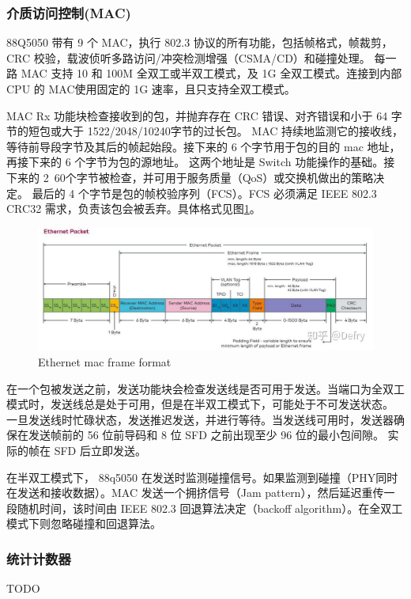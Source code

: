 \subsubsection{介质访问控制(MAC)}
88Q5050 带有 9 个 MAC，执行 802.3 协议的所有功能，包括帧格式，帧裁剪，CRC 校验，载波侦听多路访问/冲突检测增强（CSMA/CD）和碰撞处理。
每一路 MAC 支持 10 和 100M 全双工或半双工模式，及 1G 全双工模式。连接到内部 CPU 的 MAC使用固定的 1G 速率，且只支持全双工模式。

MAC Rx 功能块检查接收到的包，并抛弃存在 CRC 错误、对齐错误和小于 64 字节的短包或大于 1522/2048/10240字节的过长包。
MAC 持续地监测它的接收线，等待前导段字节及其后的帧起始段。接下来的 6 个字节用于包的目的 mac 地址，再接下来的 6 个字节为包的源地址。
这两个地址是 Switch 功能操作的基础。接下来的 2~60个字节被检查，并可用于服务质量（QoS）或交换机做出的策略决定。
最后的 4 个字节是包的帧校验序列（FCS）。FCS 必须满足 IEEE 802.3 CRC32 需求，负责该包会被丢弃。具体格式见图\ref{fig:eth_mac_format}。

\begin{figure}[ht]
    \centering
    \includegraphics[scale=0.5]{pic/eth_mac_format.jpg}
    \caption{Ethernet mac frame format}
    \label{fig:eth_mac_format}
\end{figure}

在一个包被发送之前，发送功能块会检查发送线是否可用于发送。当端口为全双工模式时，发送线总是处于可用，但是在半双工模式下，可能处于不可发送状态。
一旦发送线时忙碌状态，发送推迟发送，并进行等待。当发送线可用时，发送器确保在发送帧前的 56 位前导码和 8 位 SFD 之前出现至少 96 位的最小包间隙。
实际的帧在 SFD 后立即发送。

在半双工模式下， 88q5050 在发送时监测碰撞信号。如果监测到碰撞（PHY同时在发送和接收数据）。MAC 发送一个拥挤信号（Jam pattern），然后延迟重传一段随机时间，该时间由 IEEE 802.3 
回退算法决定（backoff algorithm）。在全双工模式下则忽略碰撞和回退算法。

\subsubsection{统计计数器}
TODO

